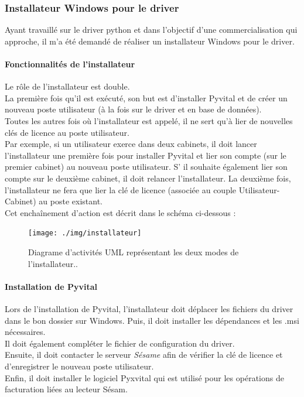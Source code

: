 \subsubsection{Installateur Windows pour le driver}
Ayant travaillé sur le driver python et dans l'objectif d'une commercialisation qui approche, il m'a été demandé de réaliser un installateur Windows pour le driver.

\paragraph*{Fonctionnalités de l'installateur\\}
Le rôle de l'installateur est double.\\ 
La première fois qu'il est exécuté, son but est d'installer Pyvital et de créer un nouveau poste utilisateur (à la fois sur le driver et en base de données). \\
Toutes les autres fois où l'installateur est appelé, il ne sert qu'à lier de nouvelles clés de licence au poste utilisateur.\\
Par exemple, si un utilisateur exerce dans deux cabinets, il doit lancer l'installateur une première fois pour installer Pyvital et lier son compte (sur le premier cabinet) au nouveau poste utilisateur.
S’ il souhaite également lier son compte sur le deuxième cabinet, il doit relancer l'installateur. La deuxième fois, l'installateur ne fera que lier la clé de licence (associée au couple Utilisateur-Cabinet) au poste existant.\\
Cet enchaînement d'action est décrit dans le schéma ci-dessous : 
\begin{figure}[H]
  \vspace{0pt}
  \centering
  \texttt{[image: ./img/installateur]}
  \caption{\label{fig:installateur} Diagrame d'activités UML représentant les deux modes de l'installateur..}
\end{figure}

\paragraph*{Installation de Pyvital}
Lors de l'installation de Pyvital, l'installateur doit déplacer les fichiers du driver dans le bon dossier sur Windows. Puis, il doit installer les dépendances et les .msi nécessaires.\\ 
Il doit également compléter le fichier de configuration du driver. \\
Ensuite, il doit contacter le serveur \textit{Sésame} afin de vérifier la clé de licence et d'enregistrer le nouveau poste utilisateur. \\
Enfin, il doit installer le logiciel Pyxvital qui est utilisé pour les opérations de facturation liées au lecteur Sésam.

